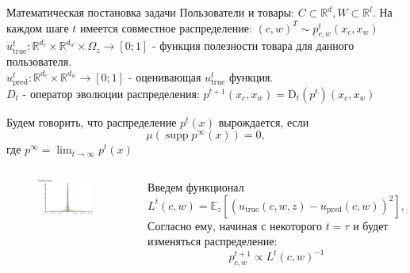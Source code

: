 \documentclass{beamer}
\DeclareMathOperator\supp{supp}
\begin{document}


\begin{frame}{Математическая постановка задачи}
 \scriptsize{Пользователи  и товары: $C \subset \mathbb{R}^d, W \subset \mathbb{R}^l$. На каждом шаге $t$ имеется совместное распределение: $(c, w)^T \sim p^{t}_{c,w} (x_c , x_w )$ \\
 $u^t_{\text{true}}: \mathbb{R}^{d_c} \times \mathbb{R}^{d_w} \times \Omega_z \to [0; 1]$ - функция полезности товара для данного пользователя.}
 \\
 $u^t_{\text{pred}}: \mathbb{R}^{d_c} \times \mathbb{R}^{d_w} \to [0; 1]$ - оценивающая $u^t_{\text{true}}$ функция.
\\$D_t$ - оператор эволюции распределения:
$p^{t + 1}(x_c, x_w) = \text{D}_t(p^{t})(x_c, x_w)$

Будем говорить, что распределение $p^t(x)$ вырождается, если 
$$
\mu (\supp p^{\infty}(x)) = 0,
$$ где $p^{\infty} = \lim_{t\to \infty} {p^t(x)}
$

    \begin{columns}[c]
    
            \begin{figure}
                    \includegraphics[width=0.9\textwidth]{images/degenerating.png}
            \end{figure}
            
            Введем функционал
            $$L^t(c, w) = \mathbb{E}_z[(u_{\text{true}}(c, w, z) - u_{\text{pred}}(c, w))^2],$$
            Согласно ему, начиная с некоторого $t=\tau$ и будет изменяться распределение:
            $$
            p^{t+1}_{c, w}  \propto L^t(c, w)^{-1}
            $$
            
        
            
    \end{columns}

\end{frame}
\end{document}
